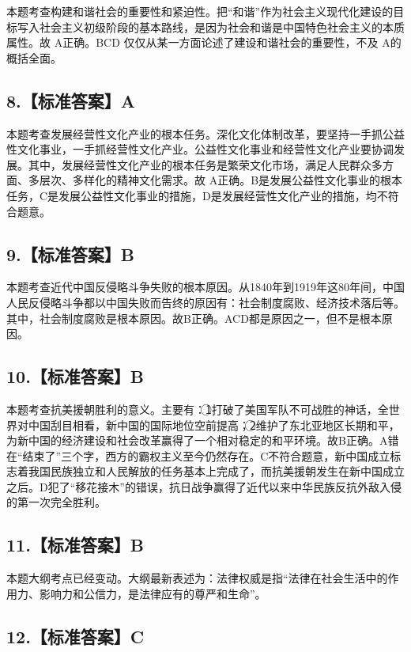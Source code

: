 \documentclass[UTF8,11pt]{ctexart}
\begin{document}
本题考查构建和谐社会的重要性和紧迫性。把“和谐”作为社会主义现代化建设的目标写入社会主义初级阶段的基本路线，是因为社会和谐是中国特色社会主义的本质属性。故 A正确。BCD 仅仅从某一方面论述了建设和谐社会的重要性，不及 A的概括全面。


\subsection*{8.【标准答案】A}

本题考查发展经营性文化产业的根本任务。深化文化体制改革，要坚持一手抓公益性文化事业，一手抓经营性文化产业。公益性文化事业和经营性文化产业要协调发展。其中，发展经营性文化产业的根本任务是繁荣文化市场，满足人民群众多方面、多层次、多样化的精神文化需求。故 A正确。B是发展公益性文化事业的根本任务，C是发展公益性文化事业的措施，D是发展经营性文化产业的措施，均不符合题意。


\subsection*{9.【标准答案】B}

本题考查近代中国反侵略斗争失败的根本原因。从1840年到1919年这80年间，中国人民反侵略斗争都以中国失败而告终的原因有：社会制度腐败、经济技术落后等。其中，社会制度腐败是根本原因。故B正确。ACD都是原因之一，但不是根本原因。


\subsection*{10.【标准答案】B}

本题考查抗美援朝胜利的意义。主要有：\textcircled{1}打破了美国军队不可战胜的神话，全世界对中国刮目相看，新中国的国际地位空前提高；\textcircled{2}维护了东北亚地区长期和平，为新中国的经济建设和社会改革赢得了一个相对稳定的和平环境。故B正确。A错在“结束了”三个字，西方的霸权主义至今仍然存在。C不符合题意，新中国成立标志着我国民族独立和人民解放的任务基本上完成了，而抗美援朝发生在新中国成立之后。D犯了“移花接木”的错误，抗日战争赢得了近代以来中华民族反抗外敌入侵的第一次完全胜利。


\subsection*{11.【标准答案】B}

本题大纲考点已经变动。大纲最新表述为：法律权威是指“法律在社会生活中的作用力、影响力和公信力，是法律应有的尊严和生命”。


\subsection*{12.【标准答案】C}
\end{document}
